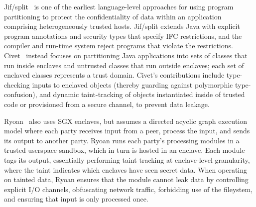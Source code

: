 


%
%
Jif/split~\cite{jif} is one of the earliest language-level approaches for using
program partitioning to protect the confidentiality of data within an
application comprising heterogeneously trusted hosts.
%
Jif/split extends Java with explicit program annotations and security types
that specify IFC restrictions, and the compiler and run-time system reject
programs that violate the restrictions. 
%
Civet~\cite{civet} instead focuses on partitioning Java applications into sets of classes
that run inside enclaves and untrusted classes that run outside enclaves; each
set of enclaved classes represents a trust domain.
Civet's contributions include type-checking inputs to enclaved
objects (thereby guarding against polymorphic type-confusion), and dynamic
taint-tracking of objects instantiated inside of trusted code or provisioned
from a secure channel, to prevent data leakage.


Ryoan~\cite{ryoan} also uses SGX enclaves, but assumes a directed acyclic graph
execution model where each party receives input from a peer, process the input,
and sends its output to another party.
%
Ryoan runs each party's processing modules in a trusted userspace sandbox,
which in turn is hosted in an enclave.
%
Each module tags its output, essentially performing taint tracking at
enclave-level granularity, where the taint indicates which enclaves have seen
secret data.
%
When operating on tainted data, Ryoan ensures that the module cannot leak data
by controlling explicit I/O channels, obfuscating network traffic, forbidding
use of the fileystem, and ensuring that input is only processed once.


